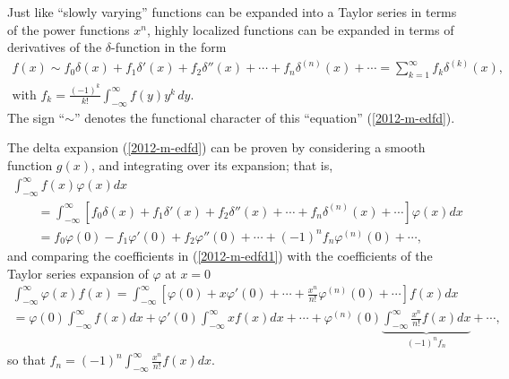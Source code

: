 Just like ``slowly varying'' functions can be expanded into a Taylor series in terms of the power functions $x^n$,
highly localized functions can be expanded in terms of derivatives of the $\delta$-function in the form \cite{lindell:438}
\begin{equation}
\begin{split}
f(x) \sim
f_0 \delta (x) +
f_1 \delta' (x) +
f_2 \delta'' (x) + \cdots +f_n \delta^{(n)}(x) + \cdots =\sum_{k=1}^\infty f_k \delta^{(k)}(x),\\
\textrm{with } f_k= \frac{(-1)^k}{k!} \int_{-\infty}^\infty f(y) y^k \, dy
.
\end{split}
\label{2012-m-edfd}
\end{equation}
The sign ``$\sim$'' denotes the functional character of this ``equation'' (\ref{2012-m-edfd}).

{\color{OliveGreen}
\bproof
The delta expansion (\ref{2012-m-edfd}) can be proven by considering a smooth function $g(x)$, and integrating over its expansion; that is,
\begin{equation}
\begin{split}
 \int_{-\infty}^\infty  f(x) \varphi (x) dx  \\
\qquad =
 \int_{-\infty}^\infty   \left[
f_0 \delta (x) +
f_1 \delta' (x) +
f_2 \delta'' (x)
+ \cdots  +
f_n \delta^{(n)}(x)
+ \cdots \right]\varphi (x)  dx \\
\qquad =
f_0  \varphi (0) - f_1  \varphi' (0) + f_2  \varphi'' (0) +\cdots  + (-1)^n  f_n  \varphi^{(n)}(0)
+ \cdots
,
\end{split}
\label{2012-m-edfd1}
\end{equation}
and comparing the coefficients in (\ref{2012-m-edfd1})
with the coefficients  of  the Taylor series expansion of $\varphi$ at $x=0$
\begin{equation}
\begin{split}
 \int_{-\infty}^\infty  \varphi (x) f(x)  =
 \int_{-\infty}^\infty  \left[
 \varphi (0) +x  \varphi' (0) + \cdots + \frac{x^n}{n!} \varphi^{(n)} (0)  + \cdots
 \right] f(x) dx \\
 =
 \varphi (0) \int_{-\infty}^\infty  f(x) dx  +
\varphi' (0) \int_{-\infty}^\infty x f(x) dx   + \cdots +  \varphi^{(n)} (0)\underbrace{\int_{-\infty}^\infty \frac{x^n}{n!} f(x) dx}_{(-1)^n f_n}  + \cdots
,
\end{split}
\label{2012-m-edfd2tse1}
\end{equation}
so that
$f_n =  (-1)^n  \int_{-\infty}^\infty \frac{x^n}{n!} f(x) dx$.
\eproof
}


